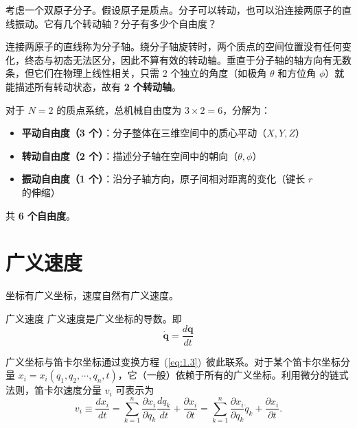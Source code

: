 \begin{example}[双原子分子的自由度]
考虑一个双原子分子。假设原子是质点。分子可以转动，也可以沿连接两原子的直线振动。它有几个转动轴？分子有多少个自由度？
\end{example}

\begin{solution}
连接两原子的直线称为分子轴。绕分子轴旋转时，两个质点的空间位置没有任何变化，终态与初态无法区分，因此不算有效的转动轴。垂直于分子轴的轴方向有无数条，但它们在物理上线性相关，只需 2 个独立的角度（如极角 $\theta$ 和方位角 $\phi$）就能描述所有转动状态，故有 \textbf{2 个转动轴}。

对于 $N=2$ 的质点系统，总机械自由度为 $3\times2=6$，分解为：
\begin{itemize}
    \item \textbf{平动自由度（3 个）}：分子整体在三维空间中的质心平动（$X, Y, Z$）
    \item \textbf{转动自由度（2 个）}：描述分子轴在空间中的朝向（$\theta, \phi$）
    \item \textbf{振动自由度（1 个）}：沿分子轴方向，原子间相对距离的变化（键长 $r$ 的伸缩）
\end{itemize}
共 \textbf{6 个自由度}。
\end{solution}
\section{广义速度}
坐标有广义坐标，速度自然有广义速度。
\begin{mydefinition}{广义速度}
广义速度是广义坐标的导数。即$$\dot{\bm{q}} = \frac{d\bm{q}}{dt}$$
\end{mydefinition}

广义坐标与笛卡尔坐标通过变换方程~(\ref{eq:1.3})~彼此联系。对于某个笛卡尔坐标分量 $x_i = x_i(q_1, q_2, \cdots, q_n, t)$，它（一般）依赖于所有的广义坐标。利用微分的链式法则，笛卡尔速度分量 $v_i$ 可表示为
\begin{equation}\label{eq:1.6}
v_i \equiv \frac{dx_i}{dt} = \sum_{k=1}^{n}\frac{\partial x_i}{\partial q_k}\frac{dq_k}{dt} + \frac{\partial x_i}{\partial t} = \sum_{k=1}^{n}\frac{\partial x_i}{\partial q_k}\dot{q}_k + \frac{\partial x_i}{\partial t}.
\end{equation}

